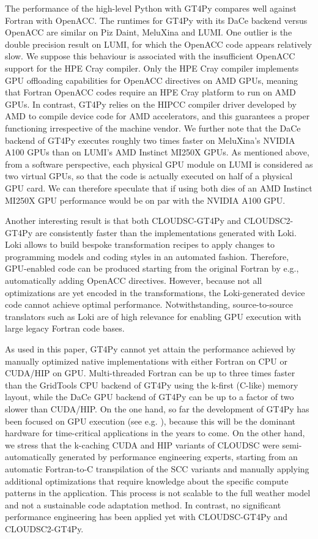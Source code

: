 \documentclass[gmd,manuscript,online]{copernicus}
\theoremstyle{theorem}
\theoremstyle{definition}
\theoremstyle{remark}
\theoremstyle{proposition}
\begin{document}
	The performance of the high-level Python with GT4Py compares well against Fortran with OpenACC. The runtimes for GT4Py with its DaCe backend versus OpenACC are similar on Piz Daint, MeluXina and LUMI. One outlier is the double precision result on LUMI, for which the OpenACC code appears relatively slow. We suppose this behaviour is associated with the insufficient OpenACC support for the HPE Cray compiler. Only the HPE Cray compiler implements GPU offloading capabilities for OpenACC directives on AMD GPUs, meaning that Fortran OpenACC codes require an HPE Cray platform to run on AMD GPUs. In contrast, GT4Py relies on the HIPCC compiler driver developed by AMD to compile device code for AMD accelerators, and this guarantees a proper functioning irrespective of the machine vendor. We further note that the DaCe backend of GT4Py executes roughly two times faster on MeluXina's NVIDIA A100 GPUs than on LUMI's AMD Instinct MI250X GPUs. As mentioned above, from a software perspective, each physical GPU module on LUMI is considered as two virtual GPUs, so that the code is actually executed on half of a physical GPU card. We can therefore speculate that if using both dies of an AMD Instinct MI250X GPU performance would be on par with the NVIDIA A100 GPU.

	Another interesting result is that both CLOUDSC-GT4Py and CLOUDSC2-GT4Py are consistently faster than the implementations generated with Loki. Loki allows to build bespoke transformation recipes to apply changes to programming models and coding styles in an automated fashion. Therefore, GPU-enabled code can be produced starting from the original Fortran by e.g., automatically adding OpenACC directives. However, because not all optimizations are yet encoded in the transformations, the Loki-generated device code cannot achieve optimal performance. Notwithstanding, source-to-source translators such as Loki are of high relevance for enabling GPU execution with large legacy Fortran code bases.

	As used in this paper, GT4Py cannot yet attain the performance achieved by manually optimized native implementations with either Fortran on CPU or CUDA/HIP on GPU. Multi-threaded Fortran can be up to three times faster than the GridTools CPU backend of GT4Py using the k-first (C-like) memory layout, while the DaCe GPU backend of GT4Py can be up to a factor of two slower than CUDA/HIP. On the one hand, so far the development of GT4Py has been focused on GPU execution (see e.g. \cite{dahm23}), because this will be the dominant hardware for time-critical applications in the years to come. On the other hand, we stress that the k-caching CUDA and HIP variants of CLOUDSC were semi-automatically generated by performance engineering experts, starting from an automatic Fortran-to-C transpilation of the SCC variants and manually applying additional optimizations that require knowledge about the specific compute patterns in the application. This process is not scalable to the full weather model and not a sustainable code adaptation method. In contrast, no significant performance engineering has been applied yet with CLOUDSC-GT4Py and CLOUDSC2-GT4Py.
\end{document}
